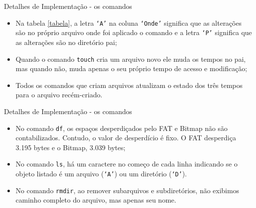 \documentclass[10pt]{beamer}
\begin{document}
    \begin{frame}{Detalhes de Implementação - os comandos}
        \begin{itemize}
            \justifying
            \item Na tabela \ref{tabela}, a letra \texttt{`A'} na coluna
                \texttt{`Onde'} significa que as alterações são no próprio
                arquivo onde foi aplicado o comando e a letra \texttt{`P'}
                significa que as alterações são no diretório pai;
            \item Quando o comando \texttt{touch} cria um arquivo novo ele muda
                os tempos no pai, mas quando não, muda apenas o seu próprio
                tempo de acesso e modificação;
            \item Todos os comandos que criam arquivos atualizam o estado dos
                três tempos para o arquivo recém-criado.
        \end{itemize}
    \end{frame}

    \begin{frame}{Detalhes de Implementação - os comandos}
        \begin{itemize}
            \justifying
            \item No comando \texttt{df}, os espaços desperdiçados pelo FAT e
                Bitmap não são contabilizados. Contudo, o valor de desperdício é
                fixo. O FAT desperdiça 3.195 bytes e o Bitmap, 3.039 bytes;
            \item No comando \texttt{ls}, há um caractere no começo de cada
                linha indicando se o objeto listado é um arquivo (\texttt{`A'})
                ou um diretório (\texttt{`D'}).
            \item No comando \texttt{rmdir}, ao remover subarquivos e
                subdiretórios, não exibimos caminho completo do arquivo, mas
                apenas seu nome.
        \end{itemize}
    \end{frame}
\end{document}
